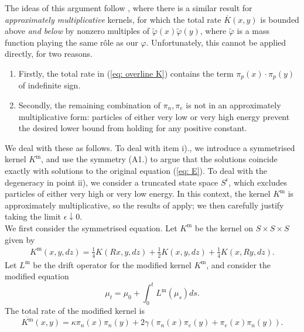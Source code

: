\documentclass[11pt, notitlepage]{article}
\begin{document}
The ideas of this argument follow \cite{N00}, where there is a similar result for \emph{approximately multiplicative} kernels, for which the total rate $\overline{K}(x,y)$ is bounded above \emph{and below} by nonzero multiples of $\widetilde{\varphi}(x)\widetilde{\varphi}(y)$, where $\widetilde{\varphi}$ is a mass function playing the same r\^ole as our $\varphi$. Unfortunately, this cannot be applied directly, for two reasons. \begin{enumerate}[label=\roman{*}).]
    \item Firstly, the total rate in (\ref{eq: overline K}) contains the term $\pi_p(x)\cdot\pi_p(y)$ of indefinite sign.
    \item Secondly, the remaining combination of $\pi_n, \pi_e$ is not in an approximately multiplicative form: particles of either very low or very high energy prevent the desired lower bound from holding for any positive constant.
\end{enumerate}
We deal with these as follows. To deal with item i)., we introduce a symmetrised kernel $K^\mathrm{m}$, and use the symmetry (A1.) to argue that the solutions coincide exactly with solutions to the original equation (\ref{eq: E}). To deal with the degeneracy in point ii), we consider a truncated state space $S^\epsilon$, which excludes particles of either very high or very low energy. In this context, the kernel $K^\mathrm{m}$ is approximately multiplicative, so the results of \cite{N00} apply; we then carefully justify taking the limit $\epsilon \downarrow 0$. \medskip \\ 
We first consider the symmetrised equation. Let $K^\mathrm{m}$ be the kernel on $S\times S\times S$ given by
 \begin{equation}\label{eq: modified K} 
 \begin{split}
 K^\mathrm{m}(x,y,dz)
 =\frac{1}{4}K(Rx, y, dz)+\frac{1}{2}K(x,y,dz)+\frac{1}{4}K(x,Ry, dz). \end{split} 
\end{equation}
Let $L^\mathrm{m}$ be the drift operator for the modified kernel $K^\mathrm{m}$, and consider the modified equation \begin{equation} \tag{mE-G}\label{eq: mE}
    \mu_t=\mu_0+\int_0^t L^\mathrm{m}(\mu_s)ds.
\end{equation}The total rate of the modified kernel is \begin{equation}
    \label{eq: modified Kbar} 
    \overline{K^\mathrm{m}}(x,y)=\kappa \pi_n(x) \pi_n(y) + 2\gamma(\pi_n(x)\pi_e(y)+\pi_e(x)\pi_n(y)).
\end{equation}
\end{document}
